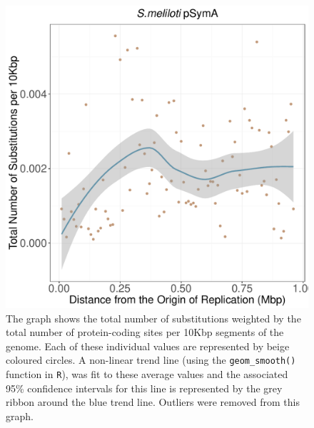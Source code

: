 \documentclass[11pt]{article}
\begin{document}
\begin{figure}[h]
	\begin{center}
		\includegraphics[width=\textwidth]{./figs/pSymA_10KB_weighted_subs_nonpar_12Sep20.pdf}
		\caption{\label{fig:pSymA_nonpar}The graph shows the total number of substitutions weighted by the total number of protein-coding sites per 10Kbp segments of the genome. Each of these individual values are represented by beige coloured circles. A non-linear trend line (using the \texttt{geom\_smooth()} function in \texttt{R}), was fit to these average values and the associated 95\% confidence intervals for this line is represented by the grey ribbon around the blue trend line. Outliers were removed from this graph.}
	\end{center}
\end{figure}
\end{document}
